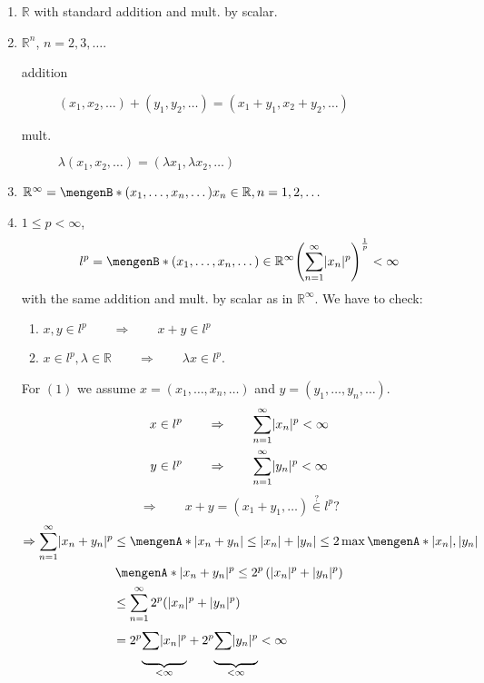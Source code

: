 \begin{beispiele}
	\begin{enumerate}[1)]
		\item $\mathbb{R}$ with standard addition and mult. by scalar.
		\item $\mathbb{R}^n$, $n=2,3, \dots$.
		\begin{description}
			\item[addition] $(x_1,x_2,\dots) + (y_1,y_2, \dots) = (x_1+y_1,x_2+y_2, \dots)$ 
			\item[mult.] $ \lambda (x_1,x_2,\dots) = (\lambda x_1, \lambda x_2, \dots)$
		\end{description} 
		\item $\mathbb{R}^{\infty} = \set[(x_1,\dots,x_n,\dots)]{x_n \in \mathbb{R}, n=1,2,\dots}$
		\item $1 \leq p < \infty$, 
		\[
			l^p = \set[(x_1,\dots,x_n, \dots) \in \mathbb{R}^{\infty}]{\left( \sum_{n=1}^{\infty} \abs{x_n}^p \right)^{\frac{1}{p}} < \infty}
		\]
		with the same addition and mult. by scalar as in $\mathbb{R}^{\infty}$. We have to check:
		\begin{enumerate}[(1)]
			\item $x,y \in l^p \qquad \Rightarrow \qquad x+y \in l^p$
			\item $x \in l^p, \lambda \in \mathbb{R} \qquad \Rightarrow \qquad \lambda x \in l^p$. 
		\end{enumerate}
		For $(1)$ we assume $x = (x_1, \dots, x_n, \dots)$ and $y = (y_1, \dots, y_n, \dots)$.
		\begin{align*}
			x \in l^p \qquad &\Rightarrow \qquad \sum_{n=1}^{\infty}\lvert x_n\rvert^p < \infty \\
			y \in l^p \qquad &\Rightarrow \qquad \sum_{n=1}^{\infty}\lvert y_n\rvert^p < \infty
		\end{align*}
		\[
			\Rightarrow \qquad  x+y = (x_1+y_1, \dots) \stackrel{?}{\in } l^p?
		\]
		\begin{align*}
			\Rightarrow \sum_{n=1}^{\infty}\abs{x_n+y_n}^p & \leq \set{\abs{x_n+y_n} \leq \abs{x_n}+ \abs{y_n} \leq 2 \max \set{\abs{x_n},\abs{y_n}}} \\
			& \,\set{\abs{x_n+y_n}^p \leq 2^p \left( \abs{x_n}^p + \abs{y_n}^p \right)} \\
			&\leq \sum_{n=1}^{\infty}2^p (\abs{x_n}^p + \abs{y_n}^p) \\
			&= 2^p \underset{< \infty}{\underbrace{\sum_{}^{}\abs{x_n}^p}}+ 2^p \underset{< \infty}{\underbrace{\sum_{}^{}\abs{y_n}^p}} < \infty
		\end{align*}

\end{enumerate}
\end{beispiele}

